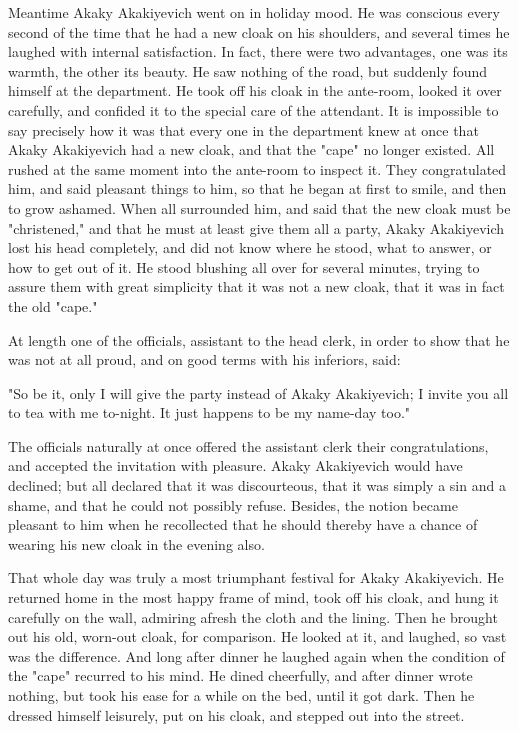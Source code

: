 Meantime Akaky Akakiyevich went on in holiday mood. He was conscious
every second of the time that he had a new cloak on his shoulders, and
several times he laughed with internal satisfaction. In fact, there
were two advantages, one was its warmth, the other its beauty. He saw
nothing of the road, but suddenly found himself at the department. He
took off his cloak in the ante-room, looked it over carefully, and
confided it to the special care of the attendant. It is impossible to
say precisely how it was that every one in the department knew at once
that Akaky Akakiyevich had a new cloak, and that the "cape" no longer
existed. All rushed at the same moment into the ante-room to inspect
it. They congratulated him, and said pleasant things to him, so that
he began at first to smile, and then to grow ashamed. When all
surrounded him, and said that the new cloak must be "christened," and
that he must at least give them all a party, Akaky Akakiyevich lost
his head completely, and did not know where he stood, what to answer,
or how to get out of it. He stood blushing all over for several
minutes, trying to assure them with great simplicity that it was not a
new cloak, that it was in fact the old "cape."

At length one of the officials, assistant to the head clerk, in order
to show that he was not at all proud, and on good terms with his
inferiors, said:

"So be it, only I will give the party instead of Akaky Akakiyevich; I
invite you all to tea with me to-night. It just happens to be my
name-day too."

The officials naturally at once offered the assistant clerk their
congratulations, and accepted the invitation with pleasure. Akaky
Akakiyevich would have declined; but all declared that it was
discourteous, that it was simply a sin and a shame, and that he could
not possibly refuse. Besides, the notion became pleasant to him when
he recollected that he should thereby have a chance of wearing his new
cloak in the evening also.

That whole day was truly a most triumphant festival for Akaky
Akakiyevich. He returned home in the most happy frame of mind, took
off his cloak, and hung it carefully on the wall, admiring afresh the
cloth and the lining. Then he brought out his old, worn-out cloak, for
comparison. He looked at it, and laughed, so vast was the difference.
And long after dinner he laughed again when the condition of the
"cape" recurred to his mind. He dined cheerfully, and after dinner
wrote nothing, but took his ease for a while on the bed, until it got
dark. Then he dressed himself leisurely, put on his cloak, and stepped
out into the street.

